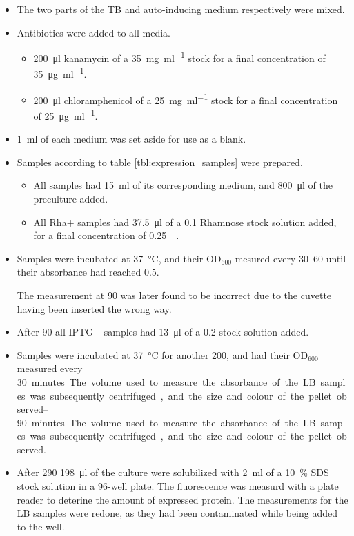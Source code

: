 \documentclass[a4paper]{scrreprt}
\begin{document}
\begin{itemize}
	\item The two parts of the TB and auto-inducing medium respectively
		were mixed.
	\item Antibiotics were added to all media.
		\begin{itemize}
			\item \SI{200}{\ul} kanamycin of a \SI{35}{\mg\per\ml}
				stock for a final concentration of
				\SI{35}{\ug\per\ml}.
			\item \SI{200}{\ul} chloramphenicol of a
				\SI{25}{\mg\per\ml} stock for a final
				concentration of \SI{25}{\ug\per\ml}.
		\end{itemize}
	\item \SI{1}{\ml} of each medium was set aside for use as a blank.
	\item Samples according to table \ref{tbl:expression_samples} were
		prepared.
		\begin{itemize}
			\item All samples had \SI{15}{\ml} of its corresponding
				medium, and \SI{800}{\ul} of the preculture
				added.
			\item All Rha+ samples had \SI{37.5}{\ul} of a
				\SI{0.1}{\Molar} Rhamnose stock solution added,
				for a final concentration of
				\SI{0.25}{\milli\Molar}.
		\end{itemize}
	\item Samples were incubated at \SI{37}{\celsius}, and their OD$_{600}$
		mesured every \SIrange{30}{60}{\min} until their absorbance had
		reached $0.5$.

		The measurement at \SI{90}{\min} was later found to be
		incorrect due to the cuvette having been inserted the wrong
		way.

	\item After \SI{90}{\min} all IPTG+ samples had \SI{13}{\ul} of a
		\SI{0.2}{\Molar} stock solution added.
	\item Samples were incubated at \SI{37}{\celsius} for another
		\SI{200}{\min}, and had their OD$_{600}$ measured every
		\SIrange{30}{90} minutes. The volume used to measure the
		absorbance of the LB samples was subsequently centrifuged, and
		the size and colour of the pellet observed.
	\item After \SI{290}{\min} \SI{198}{\ul} of the culture were
		solubilized with \SI{2}{\ml} of a \SI{10}{\percent} SDS stock
		solution in a 96-well plate. The fluorescence was measurd with
		a plate reader to deterine the amount of expressed protein. The
		measurements for the LB samples were redone, as they had been
		contaminated while being added to the well.
\end{itemize}
\end{document}
